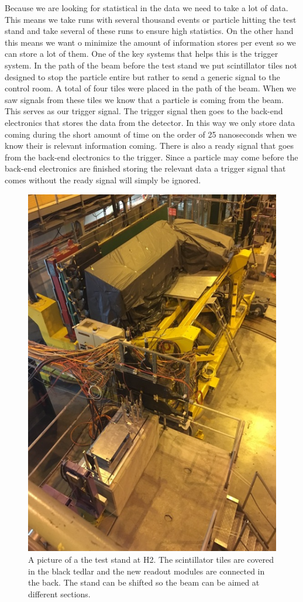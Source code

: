 Because we are looking for statistical in the data we need to take a lot of data. This means we take runs with several thousand events or particle hitting the test stand and take several of these runs to ensure high statistics. On the other hand this means we want o minimize the amount of information stores per event so we can store a lot of them. One of the key systems that helps this is the trigger system. In the path of the beam before the test stand we put scintillator tiles not designed to stop the particle entire but rather to send a generic signal to the control room. A total of four tiles were placed in the path of the beam. When we saw signals from these tiles we know that a particle is coming from the beam. This serves as our trigger signal. The trigger signal then goes to the back-end electronics that stores the data from the detector. In this way we only store data coming during the short amount of time on the order of 25 nanoseconds when we know their is relevant information coming. There is also a ready signal that goes from the back-end electronics to the trigger. Since a particle may come before the back-end electronics are finished storing the relevant data a trigger signal that comes without the ready signal will simply be ignored.

\begin{figure}
\centering
\includegraphics[width=0.4\linewidth]{Figures/Teststand.png}
\caption{A picture of a the test stand at H2. The scintillator tiles are covered in the black tedlar and the new readout modules are connected in the back. The stand can be shifted so the beam can be aimed at different sections.}
\label{fig:stand}
\end{figure}

